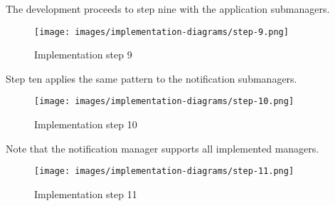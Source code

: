 \clearpage
The development proceeds to step nine with the application submanagers.

\begin{figure}[h]
    \centering
    \texttt{[image: images/implementation-diagrams/step-9.png]}
    \caption{Implementation step 9}
\end{figure}

Step ten applies the same pattern to the notification submanagers.

\begin{figure}[h]
    \centering
    \texttt{[image: images/implementation-diagrams/step-10.png]}
    \caption{Implementation step 10}
\end{figure}

\clearpage
Note that the notification manager supports all implemented managers.

\begin{figure}[h]
    \centering
    \texttt{[image: images/implementation-diagrams/step-11.png]}
    \caption{Implementation step 11}
\end{figure}
